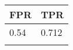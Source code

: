 \begin{tabular}{ll}
\hline
 FPR   & TPR   \\
\hline
 0.54  & 0.712 \\
       &       \\
\hline
\end{tabular}